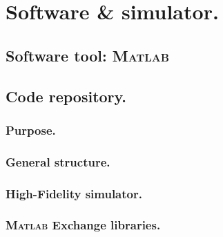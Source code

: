\chapter{Software \& simulator.}
%
\label{app: 	Software}
%
\section{Software tool: \textsc{Matlab}}
%
%
\section{Code repository.}
%
%
	\subsection{Purpose.}
	\subsection{General structure.}
	\subsection{High-Fidelity simulator.}
	\subsection{\textsc{Matlab} Exchange libraries.}
	